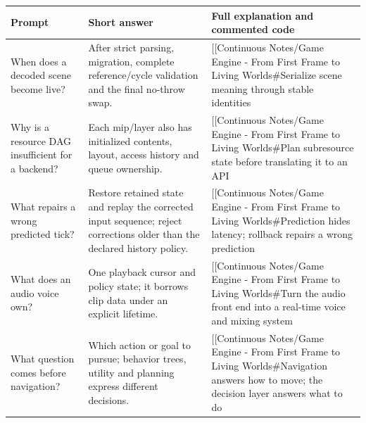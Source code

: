 {\def\LTcaptype{none} %
\begin{longtable}[]{@{}
  >{\raggedright\arraybackslash}p{}
  >{\raggedright\arraybackslash}p{}
  >{\raggedright\arraybackslash}p{}@{}}
\toprule\noalign{}
\begin{minipage}[b]{\linewidth}\raggedright
Prompt
\end{minipage} & \begin{minipage}[b]{\linewidth}\raggedright
Short answer
\end{minipage} & \begin{minipage}[b]{\linewidth}\raggedright
Full explanation and commented code
\end{minipage} \\
\midrule\noalign{}
\endhead
\bottomrule\noalign{}
\endlastfoot
When does a decoded scene become live? & After strict parsing, migration, complete reference/cycle validation and the final no-throw swap. & {[}{[}Continuous Notes/Game Engine - From First Frame to Living Worlds\#Serialize scene meaning through stable identities \\
Why is a resource DAG insufficient for a backend? & Each mip/layer also has initialized contents, layout, access history and queue ownership. & {[}{[}Continuous Notes/Game Engine - From First Frame to Living Worlds\#Plan subresource state before translating it to an API \\
What repairs a wrong predicted tick? & Restore retained state and replay the corrected input sequence; reject corrections older than the declared history policy. & {[}{[}Continuous Notes/Game Engine - From First Frame to Living Worlds\#Prediction hides latency; rollback repairs a wrong prediction \\
What does an audio voice own? & One playback cursor and policy state; it borrows clip data under an explicit lifetime. & {[}{[}Continuous Notes/Game Engine - From First Frame to Living Worlds\#Turn the audio front end into a real-time voice and mixing system \\
What question comes before navigation? & Which action or goal to pursue; behavior trees, utility and planning express different decisions. & {[}{[}Continuous Notes/Game Engine - From First Frame to Living Worlds\#Navigation answers how to move; the decision layer answers what to do \\
\end{longtable}
}

